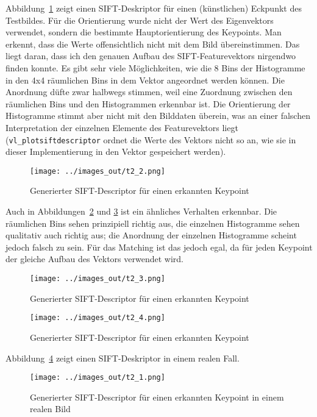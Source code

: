 Abbildung~\ref{fig:t2_2} zeigt einen SIFT-Deskriptor für einen (künstlichen) Eckpunkt des Testbildes. Für die Orientierung wurde nicht der Wert des Eigenvektors verwendet, sondern die bestimmte Hauptorientierung des Keypoints. Man erkennt, dass die Werte offensichtlich nicht mit dem Bild übereinstimmen. Das liegt daran, dass ich den genauen Aufbau des SIFT-Featurevektors nirgendwo finden konnte. Es gibt sehr viele Möglichkeiten, wie die 8 Bins der Histogramme in den 4x4 räumlichen Bins in dem Vektor angeordnet werden können. Die Anordnung düfte zwar halbwegs stimmen, weil eine Zuordnung zwischen den räumlichen Bins und den Histogrammen erkennbar ist. Die Orientierung der Histogramme stimmt aber nicht mit den Bilddaten überein, was an einer falschen Interpretation der einzelnen Elemente des Featurevektors liegt (\texttt{vl\_plotsiftdescriptor} ordnet die Werte des Vektors nicht so an, wie sie in dieser Implementierung in den Vektor gespeichert werden).

\begin{figure}[htb]
 \centering
 \texttt{[image: ../images\_out/t2\_2.png]}
 \caption{Generierter SIFT-Descriptor für einen erkannten Keypoint}
 \label{fig:t2_2}
\end{figure}

Auch in Abbildungen~\ref{fig:t2_3} und \ref{fig:t2_4} ist ein ähnliches Verhalten erkennbar. Die räumlichen Bins sehen prinzipiell richtig aus, die einzelnen Histogramme sehen qualitativ auch richtig aus; die Anordnung der einzelnen Histogramme scheint jedoch falsch zu sein. Für das Matching ist das jedoch egal, da für jeden Keypoint der gleiche Aufbau des Vektors verwendet wird.

\begin{figure}[htb]
 \centering
 \texttt{[image: ../images\_out/t2\_3.png]}
 \caption{Generierter SIFT-Descriptor für einen erkannten Keypoint}
 \label{fig:t2_3}
\end{figure}

\begin{figure}[htb]
 \centering
 \texttt{[image: ../images\_out/t2\_4.png]}
 \caption{Generierter SIFT-Descriptor für einen erkannten Keypoint}
 \label{fig:t2_4}
\end{figure}

Abbildung~\ref{fig:t2_1} zeigt einen SIFT-Deskriptor in einem realen Fall.

\begin{figure}[htb]
 \centering
 \texttt{[image: ../images\_out/t2\_1.png]}
 \caption{Generierter SIFT-Descriptor für einen erkannten Keypoint in einem realen Bild}
 \label{fig:t2_1}
\end{figure}

